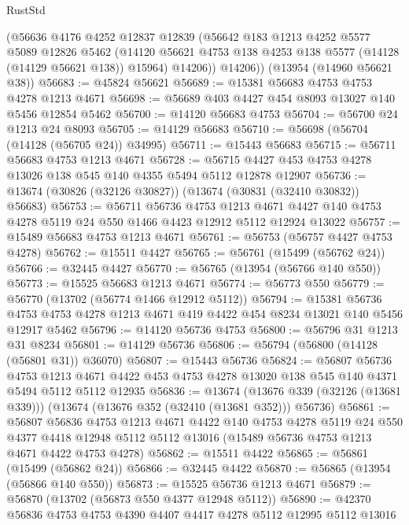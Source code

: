 \begin{lexlean}{RustStd}
\begin{coremodule}
        (@56636
          @4176
          @4252
          @12837
          @12839
          (@56642
            @183
            @1213
            @4252
            @5577
            @5089
            @12826
            @5462
            (@14120 @56621 @4753 @138 @4253 @138 @5577 (@14128 (@14129 @56621 @138)) @15964)
            @14206))
        @14206))
    (@13954 (@14960 @56621 @38))
@56683 := @45824 @56621
@56689 := @15381 @56683 @4753 @4753 @4278 @1213 @4671
@56698 := @56689 @403 @4427 @454 @8093 @13027 @140 @5456 @12854 @5462
@56700 := @14120 @56683 @4753
@56704 := @56700 @24 @1213 @24 @8093
@56705 := @14129 @56683
@56710 := @56698 (@56704 (@14128 (@56705 @24)) @34995)
@56711 := @15443 @56683
@56715 := @56711 @56683 @4753 @1213 @4671
@56728 := @56715 @4427 @453 @4753 @4278 @13026 @138 @545 @140 @4355 @5494 @5112 @12878 @12907
@56736 := @13674 (@30826 (@32126 @30827)) (@13674 (@30831 (@32410 @30832)) @56683)
@56753 := @56711
    @56736
    @4753
    @1213
    @4671
    @4427
    @140
    @4753
    @4278
    @5119
    @24
    @550
    @1466
    @4423
    @12912
    @5112
    @12924
    @13022
@56757 := @15489 @56683 @4753 @1213 @4671
@56761 := @56753 (@56757 @4427 @4753 @4278)
@56762 := @15511 @4427
@56765 := @56761 (@15499 (@56762 @24))
@56766 := @32445 @4427
@56770 := @56765 (@13954 (@56766 @140 @550))
@56773 := @15525 @56683 @1213 @4671
@56774 := @56773 @550
@56779 := @56770 (@13702 (@56774 @1466 @12912 @5112))
@56794 := @15381
    @56736
    @4753
    @4753
    @4278
    @1213
    @4671
    @419
    @4422
    @454
    @8234
    @13021
    @140
    @5456
    @12917
    @5462
@56796 := @14120 @56736 @4753
@56800 := @56796 @31 @1213 @31 @8234
@56801 := @14129 @56736
@56806 := @56794 (@56800 (@14128 (@56801 @31)) @36070)
@56807 := @15443 @56736
@56824 := @56807
    @56736
    @4753
    @1213
    @4671
    @4422
    @453
    @4753
    @4278
    @13020
    @138
    @545
    @140
    @4371
    @5494
    @5112
    @5112
    @12935
@56836 := @13674
    (@13676 @339 (@32126 (@13681 @339)))
    (@13674 (@13676 @352 (@32410 (@13681 @352))) @56736)
@56861 := @56807
    @56836
    @4753
    @1213
    @4671
    @4422
    @140
    @4753
    @4278
    @5119
    @24
    @550
    @4377
    @4418
    @12948
    @5112
    @5112
    @13016
    (@15489 @56736 @4753 @1213 @4671 @4422 @4753 @4278)
@56862 := @15511 @4422
@56865 := @56861 (@15499 (@56862 @24))
@56866 := @32445 @4422
@56870 := @56865 (@13954 (@56866 @140 @550))
@56873 := @15525 @56736 @1213 @4671
@56879 := @56870 (@13702 (@56873 @550 @4377 @12948 @5112))
@56890 := @42370 @56836 @4753 @4753 @4390 @4407 @4417 @4278 @5112 @12995 @5112 @13016

\end{coremodule}
\end{lexlean}
